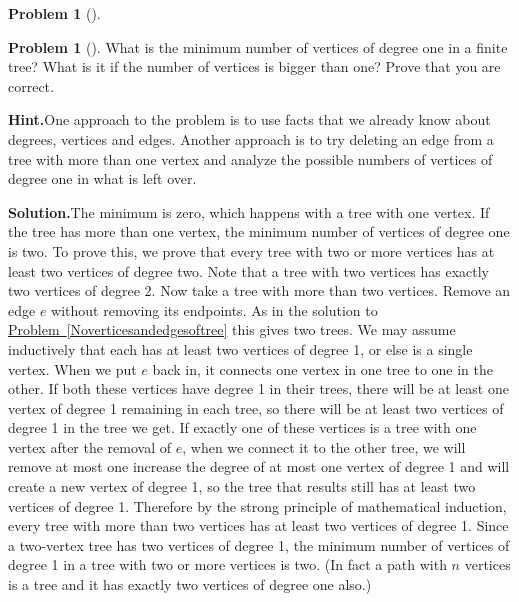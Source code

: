 \documentclass[10pt,]{book}
\theoremstyle{plain}
\theoremstyle{definition}
\newtheorem{activity}[project]{Problem}
\theoremstyle{definition}
\numberwithin{equation}{chapter}
\begin{document}
\begin{activity}[]
\end{activity}
\begin{activity}[]\label{activity-109}
What is the minimum number of vertices of degree one in a finite tree? What is it if the number of vertices is bigger than one? Prove that you are correct.%
\par\medskip\noindent%
\textbf{Hint.}\quad One approach to the problem is to use facts that we already know about degrees, vertices and edges. Another approach is to try deleting an edge from a tree with more than one vertex and analyze the possible numbers of vertices of degree one in what is left over.%
\par\medskip\noindent%
\textbf{Solution.}\quad The minimum is zero, which happens with a tree with one vertex. If the tree has more than one vertex, the minimum number of vertices of degree one is two. To prove this, we prove that every tree with two or more vertices has at least two vertices of degree two. Note that a tree with two vertices has exactly two vertices of degree 2. Now take a tree with more than two vertices. Remove an edge \(e\) without removing its endpoints. As in the solution to \hyperref[Noverticesandedgesoftree]{Problem~\ref{Noverticesandedgesoftree}} this gives two trees. We may assume inductively that each has at least two vertices of degree 1, or else is a single vertex. When we put \(e\) back in, it connects one vertex in one tree to one in the other. If both these vertices have degree 1 in their trees, there will be at least one vertex of degree 1 remaining in each tree, so there will be at least two vertices of degree 1 in the tree we get. If exactly one of these vertices is a tree with one vertex after the removal of \(e\), when we connect it to the other tree, we will remove at most one increase the degree of at most one vertex of degree 1 and will create a new vertex of degree 1, so the tree that results still has at least two vertices of degree 1. Therefore by the strong principle of mathematical induction, every tree with more than two vertices has at least two vertices of degree 1. Since a two-vertex tree has two vertices of degree 1, the minimum number of vertices of degree 1 in a tree with two or more vertices is two. (In fact a path with \(n\) vertices is a tree and it has exactly two vertices of degree one also.)%
\end{activity}
\end{document}
